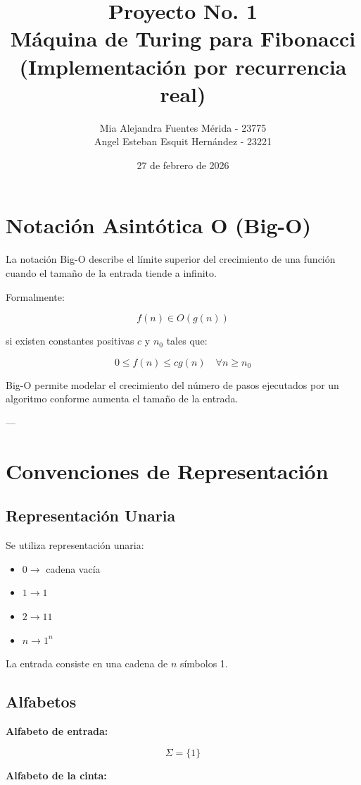 \documentclass[12pt]{article}
\title{Proyecto No. 1 \\ Máquina de Turing para Fibonacci \\ (Implementación por recurrencia real)}
\author{
Mia Alejandra Fuentes Mérida - 23775 \\
Angel Esteban Esquit Hernández - 23221
}
\date{27 de febrero de 2026}
\begin{document}
\maketitle

\section{Notación Asintótica O (Big-O)}

La notación Big-O describe el límite superior del crecimiento de una función cuando el tamaño de la entrada tiende a infinito.

Formalmente:

\[
f(n) \in O(g(n))
\]

si existen constantes positivas $c$ y $n_0$ tales que:

\[
0 \le f(n) \le c g(n) \quad \forall n \ge n_0
\]

Big-O permite modelar el crecimiento del número de pasos ejecutados por un algoritmo conforme aumenta el tamaño de la entrada.

---

\section{Convenciones de Representación}

\subsection{Representación Unaria}

Se utiliza representación unaria:

\begin{itemize}
\item $0 \rightarrow$ cadena vacía
\item $1 \rightarrow 1$
\item $2 \rightarrow 11$
\item $n \rightarrow 1^n$
\end{itemize}

La entrada consiste en una cadena de $n$ símbolos 1.

\subsection{Alfabetos}

\textbf{Alfabeto de entrada:}

\[
\Sigma = \{1\}
\]

\textbf{Alfabeto de la cinta:}
\end{document}
